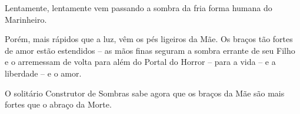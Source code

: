 Lentamente, lentamente vem passando a sombra da fria forma humana do
Marinheiro.

\smallskip
Porém, mais rápidos que a luz, vêm os pés ligeiros da Mãe. Os braços
tão fortes de amor estão estendidos -- as mãos finas seguram a sombra
errante de seu Filho e o arremessam de volta para além do Portal do
Horror -- para a vida -- e a liberdade -- e o amor.

\smallskip
O solitário Construtor de Sombras sabe agora que os braços da Mãe são
mais fortes que o abraço da Morte.


